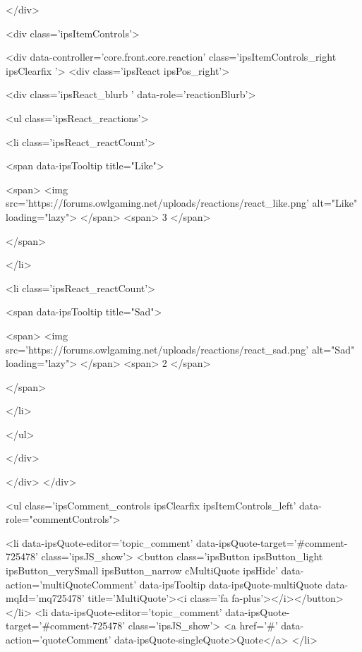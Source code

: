 			
		</div>

		
			<div class='ipsItemControls'>
				
					
						

	<div data-controller='core.front.core.reaction' class='ipsItemControls_right ipsClearfix '>	
		<div class='ipsReact ipsPos_right'>
			
				
				<div class='ipsReact_blurb ' data-role='reactionBlurb'>
					
						

	
	<ul class='ipsReact_reactions'>
		
		
			
				
				<li class='ipsReact_reactCount'>
					
						<span data-ipsTooltip title="Like">
					
							<span>
								<img src='https://forums.owlgaming.net/uploads/reactions/react_like.png' alt="Like" loading="lazy">
							</span>
							<span>
								3
							</span>
					
						</span>
					
				</li>
			
		
			
				
				<li class='ipsReact_reactCount'>
					
						<span data-ipsTooltip title="Sad">
					
							<span>
								<img src='https://forums.owlgaming.net/uploads/reactions/react_sad.png' alt="Sad" loading="lazy">
							</span>
							<span>
								2
							</span>
					
						</span>
					
				</li>
			
		
	</ul>

					
				</div>
			
			
			
		</div>
	</div>

					
				
				<ul class='ipsComment_controls ipsClearfix ipsItemControls_left' data-role="commentControls">
					
						
							<li data-ipsQuote-editor='topic_comment' data-ipsQuote-target='#comment-725478' class='ipsJS_show'>
								<button class='ipsButton ipsButton_light ipsButton_verySmall ipsButton_narrow cMultiQuote ipsHide' data-action='multiQuoteComment' data-ipsTooltip data-ipsQuote-multiQuote data-mqId='mq725478' title='MultiQuote'><i class='fa fa-plus'></i></button>
							</li>
							<li data-ipsQuote-editor='topic_comment' data-ipsQuote-target='#comment-725478' class='ipsJS_show'>
								<a href='#' data-action='quoteComment' data-ipsQuote-singleQuote>Quote</a>
							</li>
						

